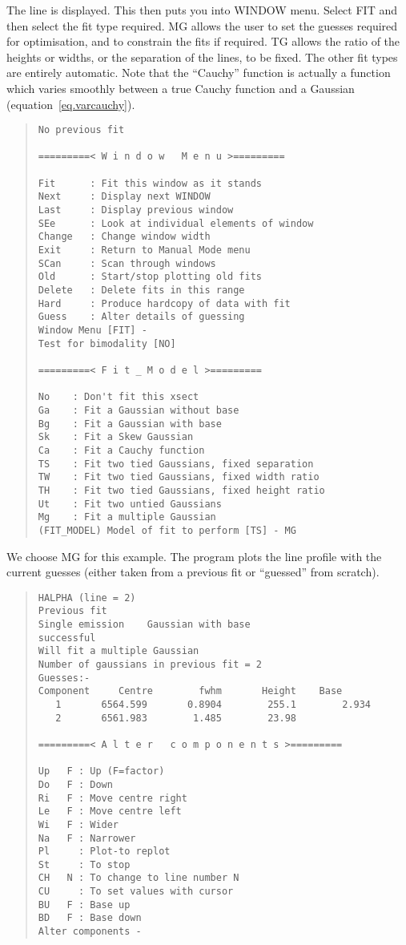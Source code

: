 The line is displayed.
This then puts you into WINDOW menu. Select FIT and then select the fit
type required.
MG allows the user to set the guesses required for
optimisation, and to constrain the fits if required. TG allows the
ratio of the heights or widths, or the separation of the lines, to be
fixed. The other fit types are entirely automatic. Note that the
``Cauchy'' function is actually a function which varies smoothly
between a true Cauchy function and a Gaussian
(equation~\ref{eq.varcauchy}).
\begin{quote}\begin{verbatim}
No previous fit
 
=========< W i n d o w   M e n u >=========
 
Fit      : Fit this window as it stands
Next     : Display next WINDOW
Last     : Display previous window
SEe      : Look at individual elements of window
Change   : Change window width
Exit     : Return to Manual Mode menu
SCan     : Scan through windows
Old      : Start/stop plotting old fits
Delete   : Delete fits in this range
Hard     : Produce hardcopy of data with fit
Guess    : Alter details of guessing
Window Menu [FIT] -
Test for bimodality [NO]
 
=========< F i t _ M o d e l >=========
 
No    : Don't fit this xsect
Ga    : Fit a Gaussian without base
Bg    : Fit a Gaussian with base
Sk    : Fit a Skew Gaussian
Ca    : Fit a Cauchy function
TS    : Fit two tied Gaussians, fixed separation
TW    : Fit two tied Gaussians, fixed width ratio
TH    : Fit two tied Gaussians, fixed height ratio
Ut    : Fit two untied Gaussians
Mg    : Fit a multiple Gaussian
(FIT_MODEL) Model of fit to perform [TS] - MG
\end{verbatim}\end{quote}
We choose MG for this example. The program plots the line profile with
the current guesses (either taken from a previous fit or ``guessed''
from scratch).
\begin{quote}\begin{verbatim}
HALPHA (line = 2)
Previous fit
Single emission    Gaussian with base
successful
Will fit a multiple Gaussian
Number of gaussians in previous fit = 2
Guesses:-
Component     Centre        fwhm       Height    Base
   1       6564.599       0.8904        255.1        2.934
   2       6561.983        1.485        23.98
 
=========< A l t e r   c o m p o n e n t s >=========
 
Up   F : Up (F=factor)
Do   F : Down
Ri   F : Move centre right
Le   F : Move centre left
Wi   F : Wider
Na   F : Narrower
Pl     : Plot-to replot
St     : To stop
CH   N : To change to line number N
CU     : To set values with cursor
BU   F : Base up
BD   F : Base down
Alter components -
\end{verbatim}\end{quote}
